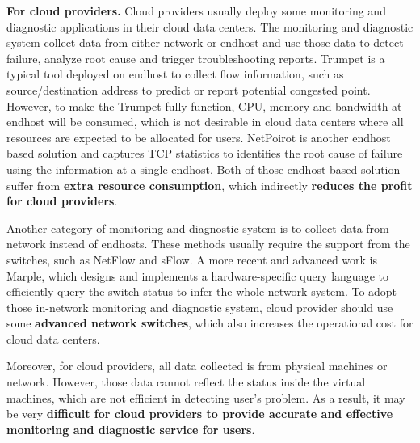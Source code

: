 \documentclass[11px]{article}
\begin{document}
\textbf{For cloud providers.} Cloud providers usually deploy some monitoring and diagnostic applications in their cloud data centers. The monitoring and diagnostic system collect data from either network or endhost and use those data to detect failure, analyze root cause and trigger troubleshooting reports. Trumpet\cite{sigcomm/trumpet} is a typical tool deployed on endhost to collect flow information, such as source/destination address to predict or report potential congested point. However, to make the Trumpet fully function, CPU, memory and bandwidth at endhost will be consumed, which is not desirable in cloud data centers where all resources are expected to be allocated for users. NetPoirot\cite{sigcomm/netpoirot} is another endhost based solution and captures TCP statistics to identifies the root cause of failure using the information at a single endhost. Both of those endhost based solution suffer from \textbf{extra resource consumption}, which indirectly \textbf{reduces the profit for cloud providers}.

Another category of monitoring and diagnostic system is to collect data from network instead of endhosts. These methods usually require the support from the switches, such as NetFlow\cite{url/netflow} and sFlow\cite{url/sflow}. A more recent and advanced work is Marple\cite{sigcomm/marple}, which designs and implements a hardware-specific query language to efficiently query the switch status to infer the whole network system. To adopt those in-network monitoring and diagnostic system, cloud provider should use some \textbf{advanced network switches}, which also increases the operational cost for cloud data centers.

Moreover, for cloud providers, all data collected is from physical machines or network. However, those data cannot reflect the status inside the virtual machines, which are not efficient in detecting user's problem. As a result, it may be very \textbf{difficult for cloud providers to provide accurate and effective monitoring and diagnostic service for users}.
\end{document}
